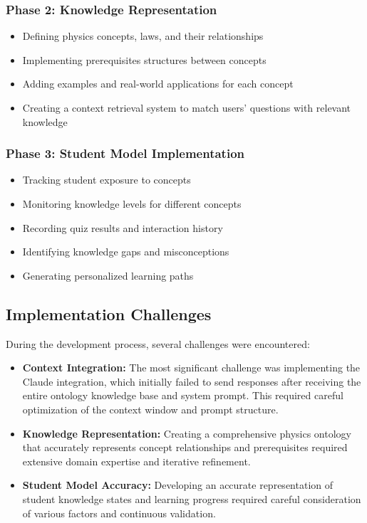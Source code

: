 \documentclass[a4paper,11pt,oneside]{article}
\begin{document}
  \subsubsection{Phase 2: Knowledge Representation}
  \begin{itemize}
    \item Defining physics concepts, laws, and their relationships
    \item Implementing prerequisites structures between concepts
    \item Adding examples and real-world applications for each concept
    \item Creating a context retrieval system to match users' questions with relevant knowledge
  \end{itemize}

  \subsubsection{Phase 3: Student Model Implementation}
  \begin{itemize}
    \item Tracking student exposure to concepts
    \item Monitoring knowledge levels for different concepts
    \item Recording quiz results and interaction history
    \item Identifying knowledge gaps and misconceptions
    \item Generating personalized learning paths
  \end{itemize}

  \subsection{Implementation Challenges}

  During the development process, several challenges were encountered:

  \begin{itemize}
    \item \textbf{Context Integration:} The most significant challenge was implementing the Claude integration, which initially 
    failed to send responses after receiving the entire ontology knowledge base and system prompt. This required careful optimization of 
    the context window and prompt structure.
    
    \item \textbf{Knowledge Representation:} Creating a comprehensive physics ontology that accurately represents concept relationships 
    and prerequisites required extensive domain expertise and iterative refinement.
    
    \item \textbf{Student Model Accuracy:} Developing an accurate representation of student knowledge states and learning progress 
    required careful consideration of various factors and continuous validation.
  \end{itemize}
\end{document}
